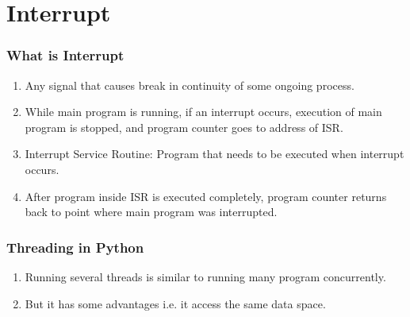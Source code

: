 \documentclass[10pt,red]{beamer}
\title
[
	Raspberry Pi Hardware Development	%
	\hspace{0.5cm}
	\insertframenumber/\inserttotalframenumber
]
{
	External interrupt on RPi using threading concept.
}
\author
[
	www.e-yantra.org
]
{
	e-Yantra Team \\
  Embedded Real-Time Systems Lab\\
  Indian Institute of Technology-Bombay \\
}
\date
{
IIT Bombay \\ {\today}
}
\begin{document}
 

\begin{frame}
	\titlepage
\end{frame} 
\section{Interrupt}
\begin{frame}
	\frametitle{What is Interrupt} \pause
		\begin{enumerate}[$\checkmark$]
			\item<+-|alert@+> Any signal that causes break in continuity of some ongoing process. \\[10pt]
			\item<+-|alert@+> While main program is running, if an interrupt occurs, execution of main program is stopped, and program counter goes to address of ISR. \\[10pt]  
			\item<+-|alert@+> Interrupt Service Routine: Program that needs to be executed when interrupt occurs. \\[10pt]
			\item<+-|alert@+> After program inside ISR is executed completely, program counter returns back to point where main program was interrupted. \\[10pt]
		\end{enumerate}  
\end{frame}
\begin{frame}
	\frametitle{Threading in Python} \pause
	\begin{enumerate}[$\checkmark$]
		\item<+-|alert@+> Running several threads is similar to running many program concurrently.
		\item<+-|alert@+>But it has some advantages i.e. it access the same data space.
	\end{enumerate}
\end{frame}
\end{document}
